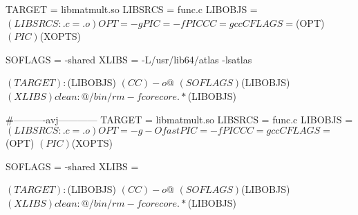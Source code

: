 TARGET  = libmatmult.so
LIBSRCS = func.c
LIBOBJS = $(LIBSRCS:.c=.o)

OPT     = -g
PIC     = -fPIC

CC	= gcc
CFLAGS= $(OPT) $(PIC) $(XOPTS)

SOFLAGS = -shared
XLIBS   = -L/usr/lib64/atlas -lsatlas

$(TARGET): $(LIBOBJS)
        $(CC) -o $@ $(SOFLAGS) $(LIBOBJS) $(XLIBS)

clean:
      	@/bin/rm -f core core.* $(LIBOBJS)
      	
      	
#----------avj------------
TARGET  = libmatmult.so
LIBSRCS = func.c
LIBOBJS = $(LIBSRCS:.c=.o)

OPT     = -g -Ofast
PIC     = -fPIC

CC	= gcc
CFLAGS= $(OPT) $(PIC) $(XOPTS)

SOFLAGS = -shared
XLIBS   = 

$(TARGET): $(LIBOBJS)
	$(CC) -o $@ $(SOFLAGS) $(LIBOBJS) $(XLIBS)

clean:
	@/bin/rm -f core core.* $(LIBOBJS)

